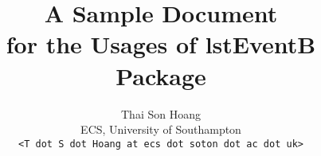 \usepackage{verbatim}
\title{A Sample Document\\for the Usages of \textsf{lstEventB} Package}
\author{Thai Son Hoang\\ECS, University of Southampton\\\texttt{<T dot S dot Hoang at ecs dot soton dot ac dot uk>}}


\maketitle




